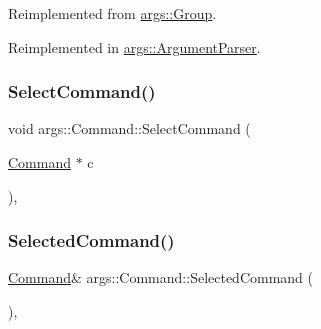 Reimplemented from \hyperlink{classargs_1_1_group_a7ccee0f0ea0902b82029b2ab30f3f84b}{args\+::\+Group}.



Reimplemented in \hyperlink{classargs_1_1_argument_parser_a73b0dc7bc87c3a44345879f34985237f}{args\+::\+Argument\+Parser}.

\mbox{\label{classargs_1_1_command_a6c78467ab5b58df69073da9878cc783c}} 
\subsubsection{\texorpdfstring{Select\+Command()}{SelectCommand()}}
{\footnotesize\ttfamily void args\+::\+Command\+::\+Select\+Command (\begin{DoxyParamCaption}\item[{\hyperlink{classargs_1_1_command}{Command} $\ast$}]{c }\end{DoxyParamCaption})\hspace{0.3cm}{\ttfamily [inline]}, {\ttfamily [noexcept]}}

\mbox{\label{classargs_1_1_command_a09a64666c38476ee923b0cb7a0f56215}} 
\subsubsection{\texorpdfstring{Selected\+Command()}{SelectedCommand()}\hspace{0.1cm}{\footnotesize\ttfamily [1/2]}}
{\footnotesize\ttfamily \hyperlink{classargs_1_1_command}{Command}\& args\+::\+Command\+::\+Selected\+Command (\begin{DoxyParamCaption}{ }\end{DoxyParamCaption})\hspace{0.3cm}{\ttfamily [inline]}, {\ttfamily [protected]}}

\mbox{\label{classargs_1_1_command_af806e6bf21282670984d1ef4680d393b}} 
